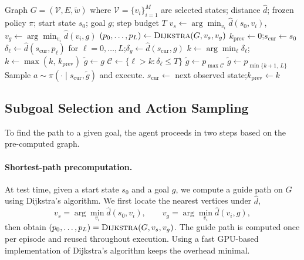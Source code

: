 \documentclass{article} %
\begin{document}
\begin{algorithm}[t]
\caption{TTGS: Subgoal Selection and Execution}
\label{alg:ttgs}
\begin{algorithmic}[1]
\REQUIRE Graph $G=(\mathcal{V},E,\tilde w)$ where $\mathcal{V}=\{v_i\}_{i=1}^M$ are selected states; distance $\hat d$; frozen policy $\pi$; start state $s_0$; goal $g$; step budget $T$
\STATE {}
\STATE $v_s \gets \arg\min_{v_i} \hat d(s_0, v_i)$,\quad $v_g \gets \arg\min_{v_i} \hat d(v_i, g)$
\STATE $(p_0,\dots,p_L) \gets \textsc{Dijkstra}(G, v_s, v_g)$
\STATE $k_{\text{prev}} \gets 0$;\quad $s_{\text{cur}} \gets s_0$
  \STATE $\delta_\ell \gets \hat d(s_{\text{cur}}, p_\ell)$ for $\ell=0,\dots,L$;\quad $\delta_g \gets \hat d(s_{\text{cur}}, g)$
  \STATE $k \gets \arg\min_\ell \delta_\ell$;\quad $k \gets \max(k,\,k_{\text{prev}})$ 
     \STATE $\tilde g \gets g$  
  \ELSE
     \STATE $\mathcal{C} \gets \{\ell > k : \delta_\ell \le T\}$ 
        \STATE $\tilde g \gets p_{\max\mathcal{C}}$ 
     \ELSE
        \STATE $\tilde g \gets p_{\min\{k+1,\,L\}}$ 
     \ENDIF
  \ENDIF
  \STATE Sample $a \sim \pi(\cdot \mid s_{\text{cur}}, \tilde g)$ and execute.
  \STATE $s_{\text{cur}} \gets$ next observed state;\quad $k_{\text{prev}} \gets k$
\ENDWHILE
\end{algorithmic}
\end{algorithm}

\subsection{Subgoal Selection and Action Sampling}
\label{subsec:subgoal}

To find the path to a given goal, the agent proceeds in two steps based on the pre-computed graph.

\paragraph{Shortest-path precomputation.}
At test time, given a start state $s_0$ and a goal $g$, we compute a guide path on $G$ using Dijkstra’s algorithm. We first locate the nearest vertices under $\hat d$,
\[
    v_s=\arg\min_{v_i} \hat d(s_0, v_i),
    \qquad
    v_g=\arg\min_{v_i} \hat d(v_i, g),
\]
then obtain $(p_0,\dots,p_L)=\textsc{Dijkstra}(G,v_s,v_g)$. The guide path is computed once per episode and reused throughout execution. Using a fast GPU-based implementation of Dijkstra’s algorithm keeps the overhead minimal.
\end{document}
